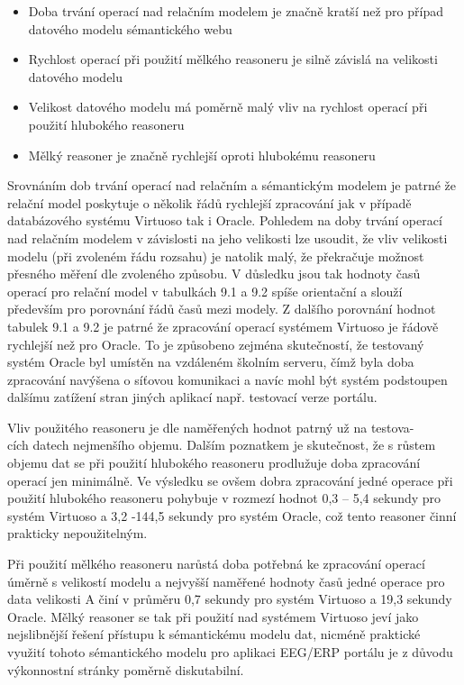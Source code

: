 \documentclass{projekt}
\begin{document}
\begin{itemize}
\item Doba trvání operací nad relačním modelem je značně kratší než pro případ datového modelu sémantického webu
\item Rychlost operací při použití mělkého reasoneru je silně závislá na velikosti datového modelu
\item Velikost datového modelu má poměrně malý vliv na rychlost operací při použití hlubokého reasoneru
\item Mělký reasoner je značně rychlejší oproti hlubokému reasoneru
\end{itemize}


Srovnáním dob trvání operací nad relačním a sémantickým modelem je patrné že relační model poskytuje o několik řádů rychlejší zpracování jak v případě databázového systému Virtuoso tak i Oracle. Pohledem na doby trvání operací nad relačním modelem v závislosti na jeho velikosti lze usoudit, že vliv velikosti modelu (při zvoleném řádu rozsahu) je natolik malý, že překračuje možnost přesného měření dle zvoleného způsobu. V důsledku jsou tak hodnoty časů operací pro relační model v tabulkách 9.1 a 9.2 spíše orientační a slouží především pro porovnání řádů časů mezi modely. Z dalšího porovnání hodnot tabulek 9.1 a 9.2 je patrné že zpracování operací systémem Virtuoso je řádově rychlejší než pro Oracle. To je způsobeno zejména skutečností, že testovaný systém Oracle byl umístěn na vzdáleném školním serveru, čímž byla doba zpracování navýšena o síťovou komunikaci a navíc mohl být systém podstoupen dalšímu zatížení stran jiných aplikací např. testovací verze portálu.

Vliv použitého reasoneru je dle naměřených hodnot patrný už na testova-\\cích datech nejmenšího objemu. Dalším poznatkem je skutečnost, že s růstem objemu dat se při použití hlubokého reasoneru prodlužuje doba zpracování operací jen minimálně. Ve výsledku se ovšem dobra zpracování jedné operace při použití hlubokého reasoneru pohybuje v rozmezí hodnot 0,3 – 5,4 sekundy pro systém Virtuoso a 3,2 -144,5 sekundy pro systém Oracle, což tento reasoner činní prakticky nepoužitelným. 

Při použití mělkého reasoneru narůstá doba potřebná ke zpracování operací úměrně s velikostí modelu a nejvyšší naměřené hodnoty časů jedné operace pro data velikosti A činí v průměru 0,7 sekundy pro systém Virtuoso a 19,3 sekundy Oracle. Mělký reasoner se tak při použití nad systémem Virtuoso jeví jako nejslibnější řešení přístupu k sémantickému modelu dat, nicméně praktické využití tohoto sémantického modelu pro aplikaci EEG/ERP portálu je z důvodu výkonnostní stránky poměrně diskutabilní. 
\end{document}
